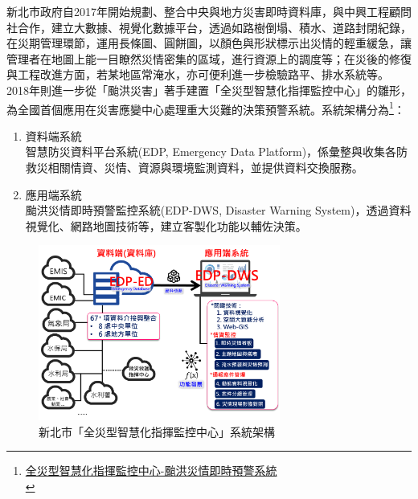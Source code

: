 \documentclass[a4paper,12pt]{article}
\begin{document}
\begin{enumerate}
\begin{enumerate}
新北市政府自2017年開始規劃、整合中央與地方災害即時資料庫，與中興工程顧問社合作，建立大數據、視覺化數據平台，透過如路樹倒塌、積水、道路封閉紀錄，在災期管理環節，運用長條圖、圓餅圖，以顏色與形狀標示出災情的輕重緩急，讓管理者在地圖上能一目瞭然災情密集的區域，進行資源上的調度等；在災後的修復與工程改進方面，若某地區常淹水，亦可便利進一步檢驗路平、排水系統等。\\
2018年則進一步從「颱洪災害」著手建置「全災型智慧化指揮監控中心」的雛形，為全國首個應用在災害應變中心處理重大災難的決策預警系統。系統架構分為\footnote{\href{http://smartcity.org.tw/application\_detail.php?id=62\&PHPSESSID=7mu78jtksuqe689dlia45c9fk6}{全災型智慧化指揮監控中心-颱洪災情即時預警系統}\\\label{orgcac72e3}}：\\
\begin{enumerate}
\item 資料端系統\\
智慧防災資料平台系統(EDP, Emergency Data Platform)，係彙整與收集各防救災相關情資、災情、資源與環境監測資料，並提供資料交換服務。\\
\item 應用端系統\\
颱洪災情即時預警監控系統(EDP-DWS, Disaster Warning System)，透過資料視覺化、網路地圖技術等，建立客製化功能以輔佐決策。\\
\end{enumerate}
\begin{figure}[htbp]
\centering
\includegraphics[width=300]{images/ITS.png}
\caption{\label{fig:FigName}新北市「全災型智慧化指揮監控中心」系統架構}
\end{figure}


\end{enumerate}
\end{enumerate}
\end{document}
